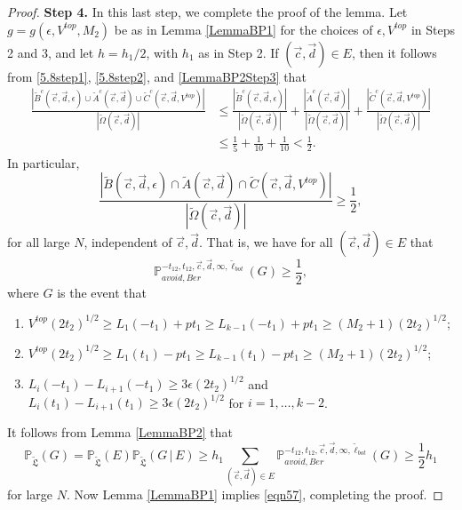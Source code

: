 \begin{proof}
	{\bf \raggedleft Step 4.} In this last step, we complete the proof of the lemma. Let $g=g(\epsilon,V^{top},M_2)$ be as in Lemma \ref{LemmaBP1} for the choices of $\epsilon,V^{top}$ in Steps 2 and 3, and let $h = h_1/2$, with $h_1$ as in Step 2. If $(\vec{c},\vec{d})\in E$, then it follows from \eqref{5.8step1}, \eqref{5.8step2}, and \eqref{LemmaBP2Step3} that
	\begin{align*}
	\frac{|\tilde{B}^c(\vec{c}, \vec{d}, \epsilon) \cup \tilde{A}^c(\vec{c}, \vec{d}) \cup \tilde{C}^c(\vec{c}, \vec{d}, V^{top}) |}{|\tilde{\Omega}(\vec{c}, \vec{d})|} &\leq \frac{|\tilde{B}^c(\vec{c}, \vec{d}, \epsilon)|}{|\tilde{\Omega}(\vec{c}, \vec{d})|} + \frac{| \tilde{A}^c(\vec{c}, \vec{d}) |}{|\tilde{\Omega}(\vec{c}, \vec{d})|} + \frac{|\tilde{C}^c(\vec{c}, \vec{d}, V^{top}) |}{|\tilde{\Omega}(\vec{c}, \vec{d})|}\\
	&\leq \frac{1}{5} + \frac{1}{10} + \frac{1}{10} < \frac{1}{2}.
	\end{align*}
	In particular,
	\begin{equation}
	\frac{|\tilde{B}(\vec{c}, \vec{d}, \epsilon) \cap \tilde{A}(\vec{c}, \vec{d}) \cap \tilde{C}(\vec{c}, \vec{d}, V^{top}) |}{|\tilde{\Omega}(\vec{c}, \vec{d})|} \geq  \frac{1}{2},
	\end{equation}
	for all large $N$, independent of $\vec{c},\vec{d}$. That is, we have for all $(\vec{c}, \vec{d}) \in E$ that
	$$\mathbb{P}_{avoid, Ber}^{-t_{12}, t_{12}, \vec{c}, \vec{d}, \infty, \tilde{\ell}_{bot}} ( G) \geq \frac{1}{2},$$
	where $G$ is the event that
	
	\begin{enumerate}
		\item $V^{top} (2t_2)^{1/2} \geq L_1(-t_1) + p t_1 \geq L_{k-1}(-t_1) + pt_1 \geq (M_2 + 1) (2t_2)^{1/2}$;
		\item $V^{top} (2t_2)^{1/2} \geq L_1(t_1) - p t_1 \geq L_{k-1}(t_1) - pt_1 \geq (M_2 + 1) (2t_2)^{1/2}$; 
		\item $L_i(-t_1) -L_{i+1}(-t_1) \geq 3\epsilon (2t_2)^{1/2}$ and $L_i(t_1) -L_{i+1}(t_1)  \geq 3 \epsilon (2t_2)^{1/2}$ for $i = 1, \dots, k-2$.
	\end{enumerate}
	It follows from Lemma \ref{LemmaBP2} that
	\[
	\mathbb{P}_{\tilde{\mathfrak{L}}}(G) = \mathbb{P}_{\tilde{\mathfrak{L}}}(E) \mathbb{P}_{\tilde{\mathfrak{L}}}(G\,|\,E) \geq h_1 \sum_{(\vec{c},\vec{d})\in E} \mathbb{P}_{avoid, Ber}^{-t_{12}, t_{12}, \vec{c}, \vec{d}, \infty, \tilde{\ell}_{bot}} ( G ) \geq \frac{1}{2}h_1
	\]
	for large $N$. Now Lemma \ref{LemmaBP1} implies \eqref{eqn57}, completing the proof.
\end{proof}
		
	
	
